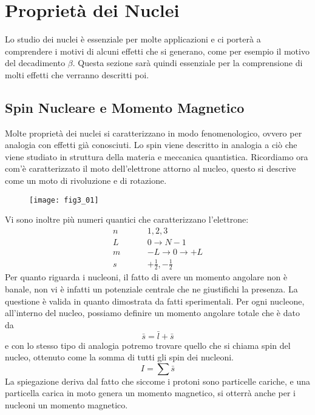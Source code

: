 \section{Proprietà dei Nuclei}
Lo studio dei nuclei è essenziale per molte applicazioni e ci porterà a comprendere i motivi di alcuni effetti che si generano, come per esempio il motivo del decadimento $\beta$. 
Questa sezione sarà quindi essenziale per la comprensione di molti effetti che verranno descritti poi.
\subsection{Spin Nucleare e Momento Magnetico}
Molte proprietà dei nuclei si caratterizzano in modo fenomenologico, ovvero per analogia con effetti già conosciuti.
Lo spin viene descritto in analogia a ciò che viene studiato in struttura della materia e meccanica quantistica. 
Ricordiamo ora com'è caratterizzato il moto dell'elettrone attorno al nucleo, questo si descrive come un moto di rivoluzione e di rotazione.
\begin{figure}[h]
\centering
\texttt{[image: fig3\_01]}
\end{figure}
Vi sono inoltre più numeri quantici che caratterizzano l'elettrone:
\begin{equation}
\begin{split}
n\hspace{1cm} & 1, 2,3\\
L\hspace{1cm} & 0\to N-1\\
m\hspace{1cm} & -L\to0\to+L\\
s\hspace{1cm} & +\frac{1}{2}, -\frac{1}{2}
\end{split}
\end{equation}
Per quanto riguarda i nucleoni, il fatto di avere un momento angolare non è banale, non vi è infatti un potenziale centrale che ne giustifichi la presenza.
La questione è valida in quanto dimostrata da fatti sperimentali.
Per ogni nucleone, all'interno del nucleo, possiamo definire un momento angolare totale che è dato da 
\begin{equation}
\bar s =\bar l + \bar s
\end{equation}
e con lo stesso tipo di analogia potremo trovare quello che si chiama spin del nucleo, ottenuto come la somma di tutti gli spin dei nucleoni.
\begin{equation}
I=\sum \bar s
\end{equation}
La spiegazione deriva dal fatto che siccome i protoni sono particelle cariche, e una particella carica in moto genera un momento magnetico, si otterrà anche per i nucleoni un momento magnetico.

